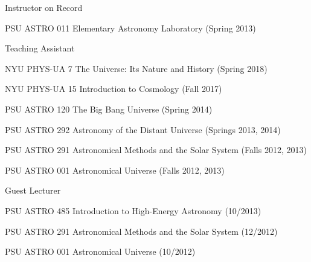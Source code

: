 \documentclass[12pt,letterpaper]{article}
\begin{document}
 \begin{list}{}{\malzlist}
 	\item Instructor on Record
 	  \begin{list}{}{\malzlist}
             \item PSU ASTRO 011 Elementary Astronomy Laboratory (Spring 2013)
 	\end{list}
 	\item Teaching Assistant
           \begin{list}{}{\malzlist}
             \item NYU PHYS-UA 7 The Universe: Its Nature and History (Spring 2018)
             \item NYU PHYS-UA 15 Introduction to Cosmology (Fall 2017)
             \item PSU ASTRO 120 The Big Bang Universe (Spring 2014)
             \item PSU ASTRO 292 Astronomy of the Distant Universe (Springs 2013, 2014)
             \item PSU ASTRO 291 Astronomical Methods and the Solar System (Falls 2012, 2013)
             \item PSU ASTRO 001 Astronomical Universe (Falls 2012, 2013)
           \end{list}
         \item Guest Lecturer
           \begin{list}{}{\malzlist}
           \item PSU ASTRO 485 Introduction to High-Energy Astronomy (10/2013)
           \item PSU ASTRO 291 Astronomical Methods and the Solar System (12/2012)
           \item PSU ASTRO 001 Astronomical Universe (10/2012)
           \end{list}
 \end{list}

%
\clearpage


\end{document}
